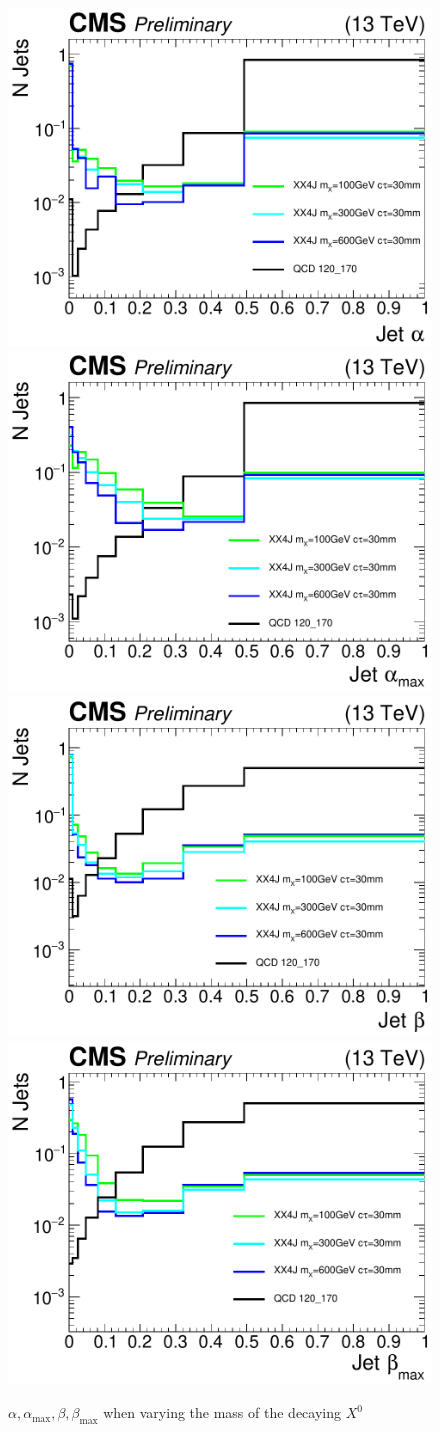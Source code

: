 \begin{figure}
\begin{center}
\includegraphics[width=.45\textwidth]{figures/an_jetid/VTX_MATCH_IP/XX4J_MASS_alpha}
\includegraphics[width=.45\textwidth]{figures/an_jetid/VTX_MATCH_IP/XX4J_MASS_alphaMax}
\includegraphics[width=.45\textwidth]{figures/an_jetid/VTX_MATCH_IP/XX4J_MASS_beta}
\includegraphics[width=.45\textwidth]{figures/an_jetid/VTX_MATCH_IP/XX4J_MASS_betaMax}
\end{center}
\caption{$\alpha, \alpha_{\textrm{max}}, \beta, \beta_{\textrm{max}}$ when varying the mass of the decaying $X^0$}
\label{fig:xx4j_mass_alpha_beta}
\end{figure}
